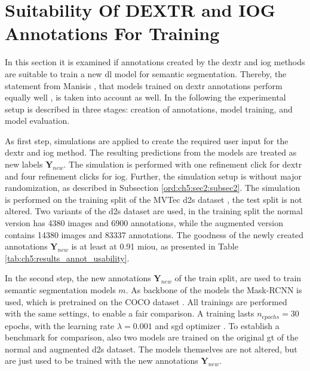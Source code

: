 
\section{Suitability Of DEXTR and IOG Annotations For Training} \label{ord:ch5:sec5_retrain}
In this section it is examined if annotations created by the \gls{dextr} and \gls{iog} methods are suitable to train a new \gls{dl} model for semantic segmentation.
Thereby, the statement from Manisis \etal, that models trained on \gls{dextr} annotations perform equally well \cite{Man18-DEXTR}, is taken into account as well.
In the following the experimental setup is described in three stages: creation of annotations, model training, and model evaluation.
 
As first step, simulations are applied to create the required user input for the \gls{dextr} and \gls{iog} method.
The resulting predictions from the models are treated as new labels $ \textbf{Y}_{new} $. 
The simulation is performed with one refinement click for \gls{dextr} and four refinement clicks for \gls{iog}.
Further, the simulation setup is without major randomization, as described in Subsection \ref{ord:ch5:sec2:subsec2}.
The simulation is performed on the training split of the MVTec \gls{d2s} dataset \cite{Paddo18-D2S}, the test split is not altered.
Two variants of the \gls{d2s} dataset are used, in the training split the normal version has 4380 images and 6900 annotations, while the augmented version contains 14380 images and 83337 annotations.
The goodness of the newly created annotations $ \textbf{Y}_{new} $ is at least at 0.91 \gls{miou}, as presented in Table \ref{tab:ch5:results_annot_usability}.

In the second step, the new annotations $ \textbf{Y}_{new} $ of the train split, are used to train semantic segmentation models $ m $.
As backbone of the models the Mask-RCNN \cite{He17-MaskR-CNN} is used, which is pretrained on the COCO dataset \cite{Lin14-Coco}.
All trainings are performed with the same settings, to enable a fair comparison.
A training lasts $ n_{epochs} = 30 $ epochs, with the learning rate $ \lambda = 0.001 $ and \gls{sgd} optimizer \cite{Ruder16-SGD}.
To establish a benchmark for comparison, also two models are trained on the original \gls{gt} of the normal and augmented \gls{d2s} dataset.
The models themselves are not altered, but are just used to be trained with the new annotations $ \textbf{Y}_{new} $.

